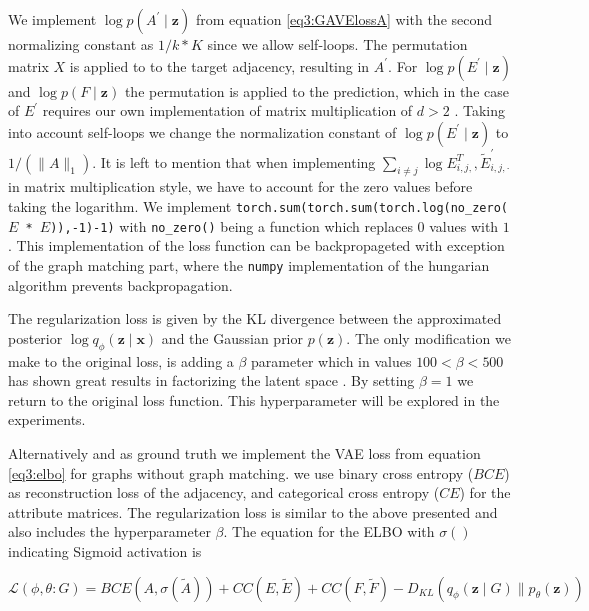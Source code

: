 We implement $\log p\left(A^{\prime} \mid \mathbf{z}\right)$ from equation \ref{eq3:GAVElossA} with the second normalizing constant as $1 / k*K$ since we allow self-loops. The permutation matrix $X$ is applied to to the target adjacency, resulting in $A^{\prime}$. For $\log p\left(E^{\prime} \mid \mathbf{z}\right)$ and $\log p\left(F \mid \mathbf{z}\right)$ the permutation is applied to the prediction, which in the case of $E^\prime$ requires our own implementation of matrix multiplication of $d>2$ . Taking into account self-loops we change the normalization constant of $\log p\left(E^{\prime} \mid \mathbf{z}\right)$ to $1 /\left(\|A\|_{1}\right)$. It is left to mention that when implementing $\sum_{i \neq j} \log E_{i, j,}^{T}, \widetilde{E}_{i, j, \cdot}^{\prime}$ in matrix multiplication style, we have to account for the zero values before taking the logarithm. We implement \texttt{torch.sum(torch.sum(torch.log(no\_zero($E$ * $\hat{E}$)),-1)-1)} with \texttt{no\_zero()} being a function which replaces $0$ values with $1$. This implementation of the loss function can be backpropageted with exception of the graph matching part, where the \texttt{numpy} implementation of the hungarian algorithm prevents backpropagation.

The regularization loss is given by the KL divergence between the approximated posterior $\log q_{\phi}\left(\mathbf{z} \mid \mathbf{x}\right)$ and the Gaussian prior $p(\mathbf{z})$. The only modification we make to the original loss, is adding a $\beta$ parameter which in values $100<\beta <500$ has shown great results in factorizing the latent space \cite{higgins_beta-vae_2016}. By setting $\beta=1$ we return to the original loss function. This hyperparameter will be explored in the experiments.


Alternatively and as ground truth we implement the VAE loss from equation \ref{eq3:elbo} for graphs without graph matching. we use binary cross entropy ($BCE$) as reconstruction loss of the adjacency,  and categorical cross entropy ($CE$) for the attribute matrices. The regularization loss is similar to the above presented and also includes the hyperparameter $\beta$. The equation for the ELBO with $\sigma()$ indicating Sigmoid activation is

\begin{equation}
    \mathcal{L}(\phi,\theta:G) = BCE(A,\sigma(\tilde{A})) + CC(E,\tilde{E}) + CC(F,\tilde{F}) - D_{K L}\left(q_{{\phi}}\left(\mathbf{z} \mid G\right) \| p_{{\theta}}(\mathbf{z})\right)
    \label{eg4:normalELBO}
\end{equation}

